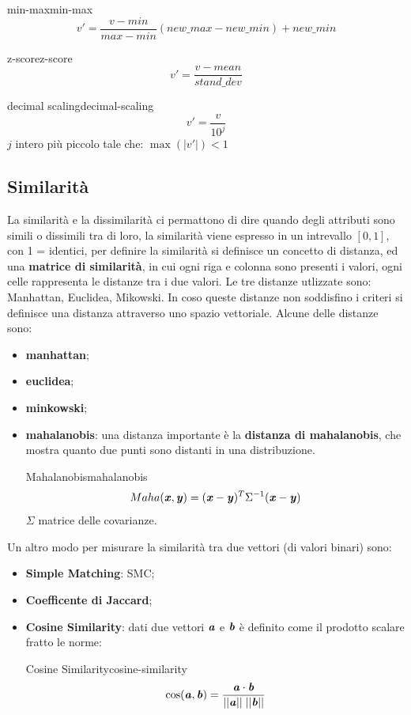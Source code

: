 \documentclass[12pt]{article}
\begin{document}
\begin{itemize}
\begin{itemize}
    \end{itemize}
        \begin{theorem}{min-max}{min-max}
            \[ v' = \frac{v - min}{max - min} (new\_max - new\_min) + new\_min \]
        \end{theorem}
        \begin{theorem}{z-score}{z-score}
            \[ v' = \frac{v - mean}{stand\_dev} \]
        \end{theorem}
        \begin{theorem}{decimal scaling}{decimal-scaling}
            \[ v' = \frac{v}{10^{j}} \]
            $j$ intero più piccolo tale che: $\max (|v'|) < 1$
        \end{theorem}
\end{itemize}

\subsection{Similarit\`a}
La similarit\`a e la dissimilarit\`a ci permattono di dire quando degli attributi sono simili o dissimili tra di loro, la similarit\`a viene espresso in un intrevallo $[0, 1]$, con 1 = identici, per definire la similarit\`a si definisce un concetto di distanza, ed una \textbf{matrice di similarit\`a}, in cui ogni riga e colonna sono presenti i valori, ogni celle rappresenta le distanze tra i due valori. Le tre distanze utlizzate sono: Manhattan, Euclidea, Mikowski. In coso queste distanze non soddisfino i criteri si definisce una distanza attraverso uno spazio vettoriale. Alcune delle distanze sono:
\begin{itemize}
    \item \textbf{manhattan};
    \item \textbf{euclidea};
    \item \textbf{minkowski};
    \item \textbf{mahalanobis}: una distanza importante \`e la \textbf{distanza di mahalanobis}, che mostra quanto due punti sono distanti in una distribuzione.
\begin{theorem}{Mahalanobis}{mahalanobis}
    \[ Maha(\textbf{\textit{x}}, \textbf{\textit{y}}) = (\textbf{\textit{x}} - \textbf{\textit{y}})^{T} \Sigma^{-1} (\textbf{\textit{x}} - \textbf{\textit{y}}) \]
    $\Sigma$ matrice delle covarianze.
\end{theorem}
\end{itemize}
Un altro modo per misurare la similarit\`a tra due vettori (di valori binari) sono:
\begin{itemize}
    \item \textbf{Simple Matching}: SMC;
    \item \textbf{Coefficente di Jaccard};
    \item \textbf{Cosine Similarity}: dati due vettori $\textbf{\textit{a}}$ e $\textbf{\textit{b}}$ \`e definito come il prodotto scalare fratto le norme:
        \begin{theorem}{Cosine Similarity}{cosine-similarity}
            \[ \cos(\textbf{\textit{a}}, \textbf{\textit{b}}) = \frac{\textbf{\textit{a}} \cdot \textbf{\textit{b}}}{||\textbf{\textit{a}}|| \; ||\textbf{\textit{b}}||}  \]
        \end{theorem}
\end{itemize}
\end{document}

